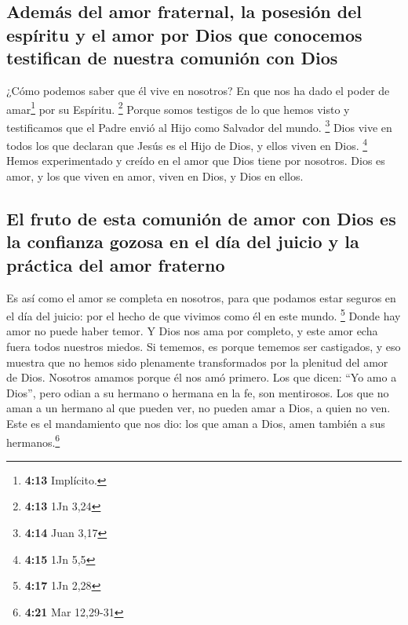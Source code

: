 \hypertarget{ademuxe1s-del-amor-fraternal-la-posesiuxf3n-del-espuxedritu-y-el-amor-por-dios-que-conocemos-testifican-de-nuestra-comuniuxf3n-con-dios}{%
\subsection{Además del amor fraternal, la posesión del espíritu y el
amor por Dios que conocemos testifican de nuestra comunión con
Dios}\label{ademuxe1s-del-amor-fraternal-la-posesiuxf3n-del-espuxedritu-y-el-amor-por-dios-que-conocemos-testifican-de-nuestra-comuniuxf3n-con-dios}}

 ¿Cómo podemos saber que él vive en nosotros? En que nos
ha dado el poder de amar\footnote{\textbf{4:13} Implícito.} por su
Espíritu. \footnote{\textbf{4:13} 1Jn 3,24}  Porque somos
testigos de lo que hemos visto y testificamos que el Padre envió al Hijo
como Salvador del mundo. \footnote{\textbf{4:14} Juan 3,17}
 Dios vive en todos los que declaran que Jesús es el Hijo
de Dios, y ellos viven en Dios. \footnote{\textbf{4:15} 1Jn 5,5}
 Hemos experimentado y creído en el amor que Dios tiene
por nosotros. Dios es amor, y los que viven en amor, viven en Dios, y
Dios en ellos.

\hypertarget{el-fruto-de-esta-comuniuxf3n-de-amor-con-dios-es-la-confianza-gozosa-en-el-duxeda-del-juicio-y-la-pruxe1ctica-del-amor-fraterno}{%
\subsection{El fruto de esta comunión de amor con Dios es la confianza
gozosa en el día del juicio y la práctica del amor
fraterno}\label{el-fruto-de-esta-comuniuxf3n-de-amor-con-dios-es-la-confianza-gozosa-en-el-duxeda-del-juicio-y-la-pruxe1ctica-del-amor-fraterno}}

 Es así como el amor se completa en nosotros, para que
podamos estar seguros en el día del juicio: por el hecho de que vivimos
como él en este mundo. \footnote{\textbf{4:17} 1Jn 2,28} 
Donde hay amor no puede haber temor. Y Dios nos ama por completo, y este
amor echa fuera todos nuestros miedos. Si tememos, es porque tememos ser
castigados, y eso muestra que no hemos sido plenamente transformados por
la plenitud del amor de Dios.  Nosotros amamos porque él
nos amó primero.  Los que dicen: ``Yo amo a Dios'', pero
odian a su hermano o hermana en la fe, son mentirosos. Los que no aman a
un hermano al que pueden ver, no pueden amar a Dios, a quien no ven.
 Este es el mandamiento que nos dio: los que aman a Dios,
amen también a sus hermanos.\footnote{\textbf{4:21} Mar 12,29-31}

